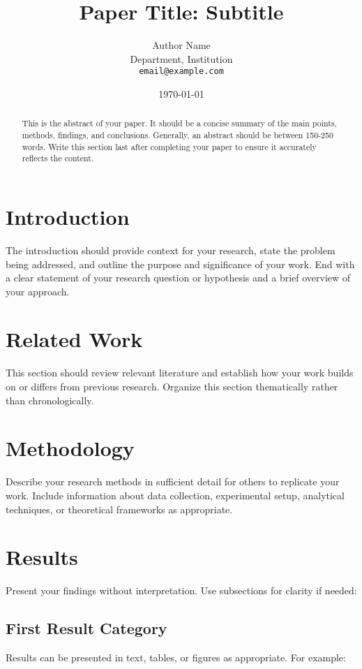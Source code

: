 \documentclass[12pt,a4paper]{article}
\title{Paper Title: Subtitle}
\author{Author Name\\
\small{Department, Institution}\\
\small{\texttt{email@example.com}}
}
\date{\today}
\begin{document}
\maketitle

\begin{abstract}
This is the abstract of your paper. It should be a concise summary of the main points, methods, findings, and conclusions. Generally, an abstract should be between 150-250 words. Write this section last after completing your paper to ensure it accurately reflects the content.
\end{abstract}

\section{Introduction}
The introduction should provide context for your research, state the problem being addressed, and outline the purpose and significance of your work. End with a clear statement of your research question or hypothesis and a brief overview of your approach.

\section{Related Work}


This section should review relevant literature and establish how your work builds on or differs from previous research. Organize this section thematically rather than chronologically.



\section{Methodology}
Describe your research methods in sufficient detail for others to replicate your work. Include information about data collection, experimental setup, analytical techniques, or theoretical frameworks as appropriate.

\section{Results}
Present your findings without interpretation. Use subsections for clarity if needed:

\subsection{First Result Category}
Results can be presented in text, tables, or figures as appropriate. For example:
\end{document}
